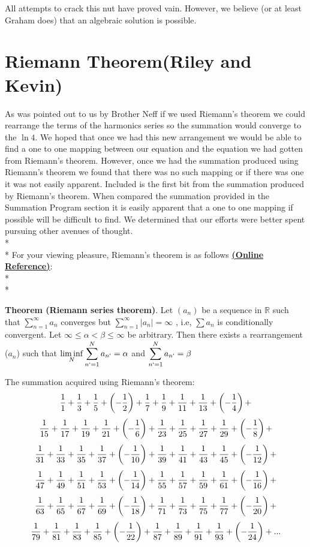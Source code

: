 \documentclass{article}
\begin{document}
All attempts to crack this nut have proved vain. However, we believe (or at least Graham does) that an algebraic solution is possible. 

\section{Riemann Theorem(Riley and Kevin)}
As was pointed out to us by Brother Neff if we used Riemann's theorem we could rearrange the terms of the harmonics series so the summation would converge to the $\ln 4$.  We hoped that once we had this new arrangement we would be able to find a one to one mapping between our equation and the equation we had gotten from Riemann's theorem. However, once we had the summation produced using Riemann's theorem we found that there was no such mapping or if there was one it was not easily apparent. Included is the first bit from the summation produced by Riemann's theorem. When compared the summation provided in the Summation Program section it is easily apparent that a one to one mapping if possible will be difficult to find. We determined that our efforts were better spent pursuing other avenues of thought.
\\*
\\* For your viewing pleasure, Riemann's theorem is as follows \href{http://planetmath.org/encyclopedia/ConditionallyConvergentSeriesOfRealNumbersCanBeRearrangedToConvergeToAnyNumber.html}{{\bf(Online Reference)}}:
\\*
\\*

{\bf Theorem (Riemann series theorem)}. Let $(a _{n})$ be a sequence in $\mathbb{R}$ such that $ \sum_{n=1}^{\infty} a _{n} $  converges but $ \sum_{n=1}^{\infty} |a _{n}| = \infty$ , i.e,  $ \sum a_{n} $ is conditionally convergent. Let $\infty \leq \alpha < \beta \leq \infty$  be arbitrary. Then there exists a rearrangement ($a _{n}$) such that $ \displaystyle\liminf_{N}   \sum_{n`=1}^{N} a _{n`} = \alpha$ and $\displaystyle\sum_{n`=1}^{N} a _{n`} = \beta$

The summation acquired using Riemann's theorem:
$${1 \over 1}+{1 \over 3}+{1 \over 5}+\left(- {1 \over 2}\right)+{1 \over 7}+{1 \over 9}+{1 \over 11}+{1 \over 13}+\left(- {1 \over 4}\right)+ $$
$${1 \over 15}+{1 \over 17}+{1 \over 19}+{1 \over 21}+\left(- {1 \over 6}\right)+{1 \over 23}+{1 \over 25}+{1 \over 27}+{1 \over 29}+\left(- {1 \over 8}\right)+ $$
$${1 \over 31}+{1 \over 33}+{1 \over 35}+{1 \over 37}+\left(- {1 \over 10}\right)+{1 \over 39}+{1 \over 41}+{1 \over 43}+{1 \over 45}+\left(- {1 \over 12}\right)+ $$
$${1 \over 47}+{1 \over 49}+{1 \over 51}+{1 \over 53}+\left(- {1 \over 14}\right)+{1 \over 55}+{1 \over 57}+{1 \over 59}+{1 \over 61}+\left(- {1 \over 16}\right)+ $$
$${1 \over 63}+{1 \over 65}+{1 \over 67}+{1 \over 69}+\left(- {1 \over 18}\right)+{1 \over 71}+{1 \over 73}+{1 \over 75}+{1 \over 77}+\left(- {1 \over 20}\right)+ $$
$${1 \over 79}+{1 \over 81}+{1 \over 83}+{1 \over 85}+\left(- {1 \over 22}\right)+{1 \over 87}+{1 \over 89}+{1 \over 91}+{1 \over 93}+\left(- {1 \over 24}\right)+ ... $$
\end{document}
